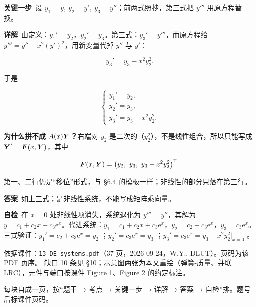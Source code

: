 \documentclass[11pt]{ctexart}
\begin{document}
\textbf{关键一步}\ 设 $y_1=y,\ y_2=y',\ y_3=y''$；前两式照抄，第三式把 $y'''$ 用原方程替换。

\textbf{详解}\ 由定义：$y_1'=y_2$，$y_2'=y_3$。第三式：$y_3'=y'''$，而原方程给 $y'''=y''-x^2(y')^2$，用新变量代掉 $y''$ 与 $y'$：

\[
y_3'=y_3-x^2y_2^2 .
\]

于是

\[
\begin{cases}
y_1'=y_2,\\[3pt]
y_2'=y_3,\\[3pt]
y_3'=y_3-x^2y_2^2 .
\end{cases}
\]

\textbf{为什么拼不成 $A(x)\boldsymbol{Y}$？}右端对 $y_2$ 是二次的（$y_2^2$），不是线性组合，所以只能写成 $\boldsymbol{Y}'=\boldsymbol{F}(x,\boldsymbol{Y})$，其中

\[
\vect{F}(x,\vect{Y})=\bigl(y_2,\ y_3,\ y_3-x^2y_2^2\bigr)^{\mathsf T}.
\]

第一、二行仍是“移位”形式，与 §6.4 的模板一样；非线性的部分只落在第三行。

\textbf{答案}\ 如上三式；是非线性系统，不能写成矩阵乘向量。

\textbf{自检}\ 在 $x=0$ 处非线性项消失，系统退化为 $y'''=y''$，其解为 $y=c_1+c_2x+c_3\mathrm{e}^{x}$。代进系统：$y_1=c_1+c_2x+c_3\mathrm{e}^x$，$y_2=c_2+c_3\mathrm{e}^x$，$y_3=c_3\mathrm{e}^x$。三式验证：$y_1'=c_2+c_3\mathrm{e}^x=y_2$ ；$y_2'=c_3\mathrm{e}^x=y_3$ ；$y_3'=c_3\mathrm{e}^x=y_3-x^2y_2^2\big|_{x=0}$ 。

\flowerrule

{\small\color{inkgray}
依据课件：\texttt{13\_DE\_systems.pdf}（37 页，2026-09-24，W.Y., DLUT）。页码为该 PDF 页序。
缺口 10 条见 §10；示意图两张为本文重绘（弹簧-质量、并联 LRC），元件与端口按课件 Figure 1、Figure 2 的约定标注。}

每块自成一页，按“题干 → 考点 → 关键一步 → 详解 → 答案 → 自检”排。题号后标课件页码。
\end{document}
